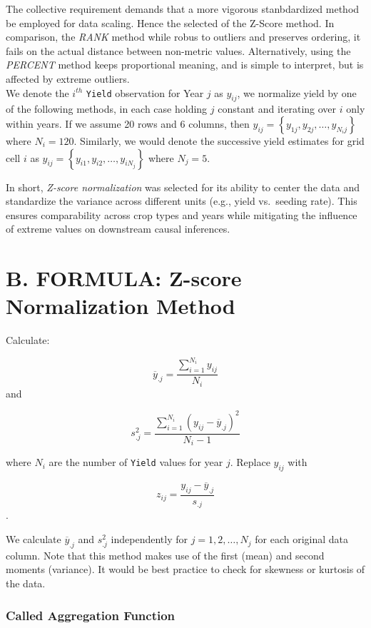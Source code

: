\documentclass[
]{article}
\begin{document}
The collective requirement demands that a more vigorous stanbdardized
method be employed for data scaling. Hence the selected of the Z-Score
method. In comparison, the \emph{RANK} method while robus to outliers
and preserves ordering, it fails on the actual distance between
non-metric values. Alternatively, using the \emph{PERCENT} method keeps
proportional meaning, and is simple to interpret, but is affected by
extreme outliers.\\
We denote the \(i^{th}\) \texttt{Yield} observation for Year \(j\) as
\(y_{ij}\), we normalize yield by one of the following methods, in each
case holding \(j\) constant and iterating over \(i\) only within years.
If we assume 20 rows and 6 columns, then
\(y_{ij} = \left\{y_{1j},y_{2j}, \dots , y_{N_ij} \right\}\) where
\(N_i=120\). Similarly, we would denote the successive yield estimates
for grid cell \(i\) as
\(y_{ij} = \left\{y_{i1},y_{i2}, \dots , y_{iN_j} \right\}\) where
\(N_j=5\).

In short, \emph{Z-score normalization} was selected for its ability to
center the data and standardize the variance across different units
(e.g., yield vs.~seeding rate). This ensures comparability across crop
types and years while mitigating the influence of extreme values on
downstream causal inferences.

\section{B. FORMULA: Z-score Normalization
Method}\label{b.-formula-z-score-normalization-method}

Calculate:

\[
\overline{y}_{. j} = \frac{\sum_{i=1}^{N_i} y_{ij}}{N_i}
\] and

\[
s^2_{. j} = \frac{\sum_{i=1}^{N_i} (y_{ij}-\overline{y}_{. j})^2}{N_i-1}
\]

where \(N_i\) are the number of \texttt{Yield} values for year \(j\).
Replace \(y_{ij}\) with

\[
z_{ij} = \frac{y_{ij} -\overline{y}_{. j} }{s_{. j}}
\].

We calculate \(\overline{y}_{. j}\) and \(s^2_{. j}\) independently for
\(j = 1,2, \dots,N_j\) for each original data column. Note that this
method makes use of the first (mean) and second moments (variance). It
would be best practice to check for skewness or kurtosis of the data.

\subsubsection{Called Aggregation
Function}\label{called-aggregation-function-1}
\end{document}
